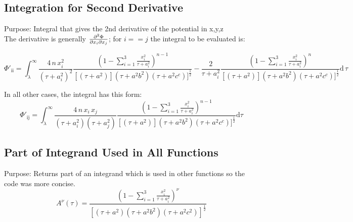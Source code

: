 \documentclass[a4paper,11pt]{article}
\begin{document}
			
	
		
		\subsection{Integration for Second Derivative}
			Purpose: Integral that gives the 2nd derivative of the potential in x,y,z \\
			
			\noindent The derivative is generally $ \pdv{\Phi}{x_i}{x_j} $; for $ i==j $ the integral to be evaluated is: 
			
		\begin{equation}
		\Phi'_{\mathrm{ii}} = \int_{\lambda}^{\infty} 
		 \frac{4\,n\,x_i^2}{(\tau + a_i^2)^2} \frac{\left(1- \sum_{i=1}^{3} \frac{x_i^2}{\tau + a_i^2}\right)^{n-1}}{[(\tau + a^2)](\tau + a^2b^2)(\tau + a^2c^c)]^\frac{1}{2}}
		- \frac{2}{\tau + a_i^2} \frac{\left(1- \sum_{i=1}^{3} \frac{x_i^2}{\tau + a_i^2}\right)^{n}}{[(\tau + a^2)](\tau + a^2b^2)(\tau + a^2c^c)]^\frac{1}{2}} \mathrm{d}\,\tau
		\end{equation}
		
			\noindent In all other cases, the integral has this form:
		\begin{equation}
		\Phi'_{\mathrm{ij}} = \int_{\lambda}^{\infty} 
		\frac{4\,n\,x_i\,x_j}{(\tau + a_i^2)(\tau + a_j^2)} \frac{\left(1- \sum_{i=1}^{3} \frac{x_i^2}{\tau + a_i^2}\right)^{n-1}}{[(\tau + a^2)](\tau + a^2b^2)(\tau + a^2c^c)]^\frac{1}{2}} \mathrm{d}\tau
		\end{equation}	
			
			
		
	
		\subsection{Part of Integrand Used in All Functions}
			Purpose: Returns part of an integrand which is used in other functions so the code was more concise. \\
		\begin{equation}
		A^{\nu}(\tau) = \frac{\left(1- \sum_{i=1}^{3} \frac{x_i^2}{\tau + a_i^2}\right)^{\nu}}{[(\tau + a^2)(\tau + a^2b^2)(\tau + a^2c^2)]^\frac{1}{2}}
		\end{equation}
			
			
\end{document}
